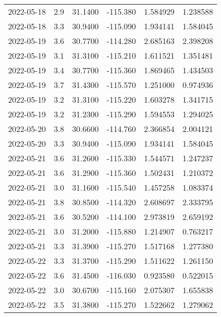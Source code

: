 \begin{tabular}{lrrrrr}
2022-05-18 &       2.9 &  31.1400 &  -115.380 &         1.584929 &         1.238588 \\
2022-05-18 &       3.3 &  30.9400 &  -115.090 &         1.934141 &         1.584045 \\
2022-05-19 &       3.6 &  30.7700 &  -114.280 &         2.685163 &         2.398208 \\
2022-05-19 &       3.1 &  31.3100 &  -115.210 &         1.611521 &         1.351481 \\
2022-05-19 &       3.4 &  30.7700 &  -115.360 &         1.869465 &         1.434503 \\
2022-05-19 &       3.7 &  31.4300 &  -115.570 &         1.251000 &         0.974936 \\
2022-05-19 &       3.2 &  31.3100 &  -115.220 &         1.603278 &         1.341715 \\
2022-05-19 &       3.2 &  31.2300 &  -115.290 &         1.594553 &         1.294025 \\
2022-05-20 &       3.8 &  30.6600 &  -114.760 &         2.366854 &         2.004121 \\
2022-05-20 &       3.3 &  30.9400 &  -115.090 &         1.934141 &         1.584045 \\
2022-05-21 &       3.6 &  31.2600 &  -115.330 &         1.544571 &         1.247237 \\
2022-05-21 &       3.6 &  31.2900 &  -115.360 &         1.502431 &         1.210372 \\
2022-05-21 &       3.0 &  31.1600 &  -115.540 &         1.457258 &         1.083374 \\
2022-05-21 &       3.8 &  30.8500 &  -114.320 &         2.608697 &         2.333795 \\
2022-05-21 &       3.6 &  30.5200 &  -114.100 &         2.973819 &         2.659192 \\
2022-05-21 &       3.0 &  31.2000 &  -115.880 &         1.214907 &         0.763217 \\
2022-05-21 &       3.3 &  31.3900 &  -115.270 &         1.517168 &         1.277380 \\
2022-05-22 &       3.3 &  31.3700 &  -115.290 &         1.511622 &         1.261150 \\
2022-05-22 &       3.6 &  31.4500 &  -116.030 &         0.923580 &         0.522015 \\
2022-05-22 &       3.0 &  30.6700 &  -115.160 &         2.075307 &         1.655838 \\
2022-05-22 &       3.5 &  31.3800 &  -115.270 &         1.522662 &         1.279062 \\

\end{tabular}
